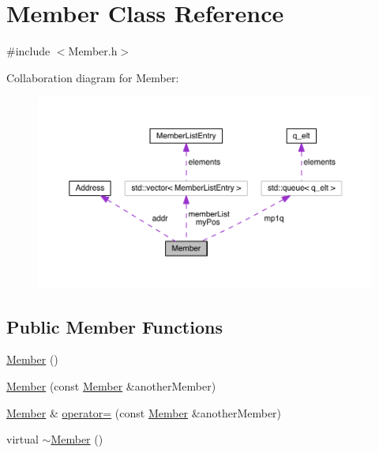 \hypertarget{class_member}{}\section{Member Class Reference}
\label{class_member}


{\ttfamily \#include $<$Member.\+h$>$}



Collaboration diagram for Member\+:\nopagebreak
\begin{figure}[H]
\begin{center}
\leavevmode
\includegraphics[width=350pt]{d1/d93/class_member__coll__graph}
\end{center}
\end{figure}
\subsection*{Public Member Functions}
\begin{DoxyCompactItemize}
\item 
\hyperlink{class_member_a44241aa6aa9b792b550d9cc29e7ad050}{Member} ()
\item 
\hyperlink{class_member_ad581ba97ca2f62a40d948b6f1ce4d018}{Member} (const \hyperlink{class_member}{Member} \&another\+Member)
\item 
\hyperlink{class_member}{Member} \& \hyperlink{class_member_af7884cb93b9fcfaefb65b76151daadf0}{operator=} (const \hyperlink{class_member}{Member} \&another\+Member)
\item 
virtual \hyperlink{class_member_a9e993260f63c73a91f1cb9b55fcef903}{$\sim$\+Member} ()
\end{DoxyCompactItemize}
